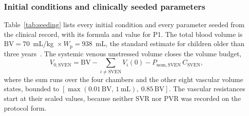 \subsubsection{Initial conditions and clinically seeded parameters}
Table~\ref{tab:seeding} lists every initial condition and every parameter seeded from the clinical record, with its formula and value for P1. The total blood volume is $\mathrm{BV} = 70$~mL/kg~$\times\,W_{\mathrm{p}} = 938$~mL, the standard estimate for children older than three years~\cite{Cote2024}. The systemic venous unstressed volume closes the volume budget,
\begin{equation}
V_{0,\mathrm{SVEN}} = \mathrm{BV} - \sum_{i \neq \mathrm{SVEN}} V_i(0) - P_{\mathrm{nom,SVEN}}\,C_{\mathrm{SVEN}},
\label{eq:sven}
\end{equation}
where the sum runs over the four chambers and the other eight vascular volume states, bounded to $[\max(0.01\,\mathrm{BV},\,1~\mathrm{mL}),\ 0.85\,\mathrm{BV}]$. The vascular resistances start at their scaled values, because neither SVR nor PVR was recorded on the protocol form.

